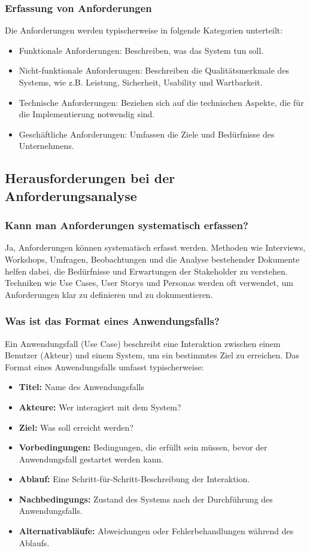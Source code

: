 \documentclass[main.tex]{subfiles}
\begin{document}
\subsubsection*{Erfassung von Anforderungen}
Die Anforderungen werden typischerweise in folgende Kategorien unterteilt:
\begin{itemize}
    \item Funktionale Anforderungen: Beschreiben, was das System tun soll.
    \item Nicht-funktionale Anforderungen: Beschreiben die Qualitätsmerkmale des Systems, wie z.B. Leistung, Sicherheit, Usability und Wartbarkeit.
    \item Technische Anforderungen: Beziehen sich auf die technischen Aspekte, die für die Implementierung notwendig sind.
    \item Geschäftliche Anforderungen: Umfassen die Ziele und Bedürfnisse des Unternehmens.
\end{itemize}

\subsection{Herausforderungen bei der Anforderungsanalyse}
\subsubsection*{Kann man Anforderungen systematisch erfassen?} %
Ja, Anforderungen können systematisch erfasst werden. Methoden wie Interviews, Workshops, Umfragen, Beobachtungen und die Analyse bestehender Dokumente helfen dabei, die Bedürfnisse und Erwartungen der Stakeholder zu verstehen. Techniken wie \glspl{Use Case}, \glspl{User Story} und Personas werden oft verwendet, um Anforderungen klar zu definieren und zu dokumentieren.

\subsubsection*{Was ist das Format eines Anwendungsfalls?}
Ein Anwendungsfall (Use Case) beschreibt eine Interaktion zwischen einem Benutzer (Akteur) und einem System, um ein bestimmtes Ziel zu erreichen. Das Format eines Anwendungsfalls umfasst typischerweise:
\begin{itemize}
    \item \textbf{Titel:} Name des Anwendungsfalls
    \item \textbf{Akteure:} Wer interagiert mit dem System?
    \item \textbf{Ziel:} Was soll erreicht werden?
    \item \textbf{Vorbedingungen:} Bedingungen, die erfüllt sein müssen, bevor der Anwendungsfall gestartet werden kann.
    \item \textbf{Ablauf:} Eine Schritt-für-Schritt-Beschreibung der Interaktion.
    \item \textbf{\glspl{Nachbedingung}:} Zustand des Systems nach der Durchführung des Anwendungsfalls.
    \item \textbf{Alternativabläufe:} Abweichungen oder Fehlerbehandlungen während des Ablaufs.
\end{itemize}
\end{document}
